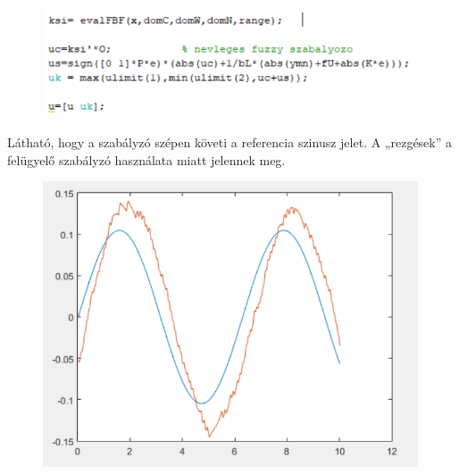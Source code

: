 \begin{figure}[!h]
\centering
\includegraphics[width=111mm, keepaspectratio]{figures/m03/fig8.png}
\label{fig:fig1}
\end{figure}
\newpage

Látható, hogy a szabályzó szépen követi a referencia szinusz jelet. A „rezgések” a felügyelő szabályzó használata miatt jelennek meg.

\begin{figure}[!h]
	\centering
	\includegraphics[width=111mm, keepaspectratio]{figures/m03/fig9.png}
	\label{fig:fig1}
\end{figure}






